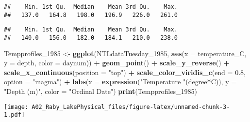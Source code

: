 \documentclass[]{article}
\newenvironment{Shaded}{\begin{snugshade}}{\end{snugshade}}
\newcommand{\DataTypeTok}[1]{\textcolor[rgb]{0.13,0.29,0.53}{#1}}
\newcommand{\DecValTok}[1]{\textcolor[rgb]{0.00,0.00,0.81}{#1}}
\newcommand{\FloatTok}[1]{\textcolor[rgb]{0.00,0.00,0.81}{#1}}
\newcommand{\KeywordTok}[1]{\textcolor[rgb]{0.13,0.29,0.53}{\textbf{#1}}}
\newcommand{\NormalTok}[1]{#1}
\newcommand{\OperatorTok}[1]{\textcolor[rgb]{0.81,0.36,0.00}{\textbf{#1}}}
\newcommand{\StringTok}[1]{\textcolor[rgb]{0.31,0.60,0.02}{#1}}
\begin{document}
\begin{verbatim}
##    Min. 1st Qu.  Median    Mean 3rd Qu.    Max. 
##   137.0   164.8   198.0   196.9   226.0   261.0
\end{verbatim}

\begin{Shaded}
\end{Shaded}

\begin{verbatim}
##    Min. 1st Qu.  Median    Mean 3rd Qu.    Max. 
##   140.0   156.0   182.0   184.1   210.0   238.0
\end{verbatim}

\begin{Shaded}
\begin{Highlighting}[]
\NormalTok{Tempprofiles_}\DecValTok{1985}\NormalTok{ <-}\StringTok{ }
\StringTok{  }\KeywordTok{ggplot}\NormalTok{(NTLdataTuesday_}\DecValTok{1985}\NormalTok{, }
         \KeywordTok{aes}\NormalTok{(}\DataTypeTok{x =}\NormalTok{ temperature_C, }\DataTypeTok{y =}\NormalTok{ depth, }\DataTypeTok{color =}\NormalTok{ daynum)) }\OperatorTok{+}
\StringTok{  }\KeywordTok{geom_point}\NormalTok{() }\OperatorTok{+}
\StringTok{  }\KeywordTok{scale_y_reverse}\NormalTok{() }\OperatorTok{+}
\StringTok{  }\KeywordTok{scale_x_continuous}\NormalTok{(}\DataTypeTok{position =} \StringTok{"top"}\NormalTok{) }\OperatorTok{+}
\StringTok{  }\KeywordTok{scale_color_viridis_c}\NormalTok{(}\DataTypeTok{end =} \FloatTok{0.8}\NormalTok{, }\DataTypeTok{option =} \StringTok{"magma"}\NormalTok{) }\OperatorTok{+}\StringTok{ }
\StringTok{  }\KeywordTok{labs}\NormalTok{(}\DataTypeTok{x =} \KeywordTok{expression}\NormalTok{(}\StringTok{"Temperature "}\NormalTok{(degree}\OperatorTok{*}\NormalTok{C)), }\DataTypeTok{y =} \StringTok{"Depth (m)"}\NormalTok{, }
       \DataTypeTok{color =} \StringTok{"Ordinal Date"}\NormalTok{)}
\KeywordTok{print}\NormalTok{(Tempprofiles_}\DecValTok{1985}\NormalTok{)}
\end{Highlighting}
\end{Shaded}

\texttt{[image: A02\_Raby\_LakePhysical\_files/figure-latex/unnamed-chunk-3-1.pdf]}
\end{document}
